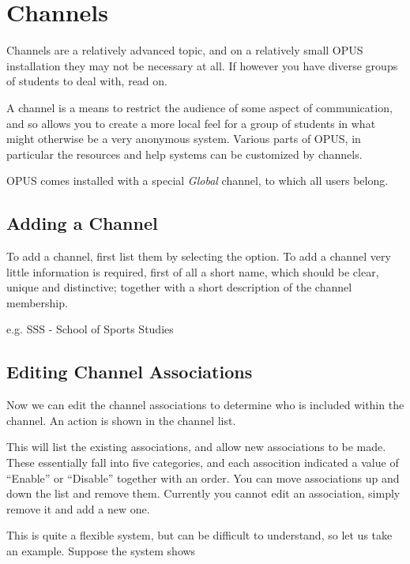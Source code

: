 \documentclass[12 pt]{book}
\begin{document}
\section{Channels}
\label{Channels}

Channels are a relatively advanced topic, and on a relatively small OPUS
installation they may not be necessary at all. If however you have diverse
groups of students to deal with, read on.

A channel is a means to restrict the audience of some aspect of communication,
and so allows you to create a more local feel for a group of students in what
might otherwise be a very anonymous system. Various parts of OPUS, in particular
the resources and help systems can be customized by channels.

OPUS comes installed with a special \emph{Global} channel, to which all users
belong.

\subsection{Adding a Channel}

To add a channel, first list them by selecting the 
 option. To add a channel very little
information is required, first of all a short name, which should be clear,
unique and distinctive; together with a short description of the channel
membership.

e.g. SSS - School of Sports Studies

\subsection{Editing Channel Associations}
\label{ChannelAssociations}

Now we can edit the channel associations to determine who is included within
the channel. An  action is shown in the channel list.

This will list the existing associations, and allow new associations to be
made. These essentially fall into five categories, and each assocition 
indicated a value of ``Enable'' or ``Disable'' together with an order. You
can move associations up and down the list and remove them. Currently you
cannot edit an association, simply remove it and add a new one.

This is quite a flexible system, but can be difficult to understand, so
let us take an example. Suppose the system shows
\end{document}
